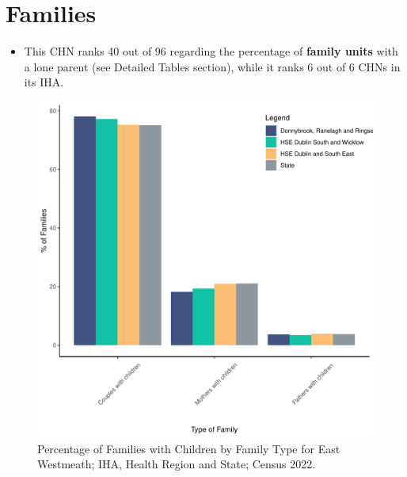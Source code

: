 \documentclass{article}
\begin{document}
\section{Families}\label{sect:Fam}
\begin{itemize}
\item This CHN ranks  40 out of 96 regarding the percentage of \textbf{family units} with a lone parent (see Detailed Tables section), while it ranks   6 out of 6 CHNs in its IHA.
\end{itemize}
\begin{figure}[H]
	\centering
	\includegraphics[width = 150mm]{../figures/FamED.pdf}
	\caption{Percentage of Families with Children by Family Type for East Westmeath; IHA, Health Region and State; Census 2022.}
	\label{fig:vbnv}
	\end{figure}
	
\end{document}
